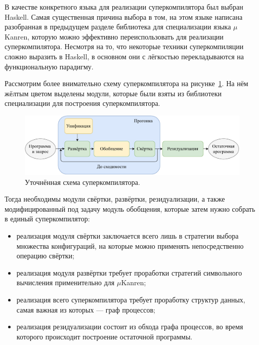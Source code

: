 В качестве конкретного языка для реализации суперкомпилятора был выбран Haskell.
Самая существенная причина выбора в том, на этом языке написана разобранная
в предыдущем разделе библиотека для специализации языка $\mu$Kanren, которую
можно эффективно переиспользовать для реализации суперкомпилятора.
Несмотря на то, что некоторые техники суперкомпиляции сложно выразить
в Haskell, в основном они
с лёгкостью перекладываются на функциональную парадигму.

Рассмотрим более внимательно схему суперкомпилятора на рисунке~\ref{fig:scompWork}.
На нём жёлтым цветом выделены модули, которые были взяты из библиотеки
специализации для построения суперкомпилятора.

\begin{figure}[h!]
\center
\includegraphics[width=\textwidth]{Kuklina/src/sc/scompflow.pdf}
\caption{Уточнённая схема суперкомпилятора.}
\label{fig:scompWork}
\end{figure}

Тогда необходимы модули  свёртки, развёртки, резидуализации,
а также модифицированный под задачу модуль обобщения, которые затем
нужно собрать в единый суперкомпилятор:
\begin{itemize}

\item реализация модуля свёртки заключается всего лишь в стратегии выбора множества
      конфигураций, на которые можно применять непосредственно операцию свёртки;

\item реализация модуля развёртки требует проработки стратегий символьного вычисления
      применительно для $\mu$Kanren;
\item реализация всего суперкомпилятора требует проработку структур данных, самая
      важная из которых --- граф процессов;
\item реализация резидуализации состоит из обхода графа процессов, во время
      которого происходит построение остаточной программы.
\end{itemize}

